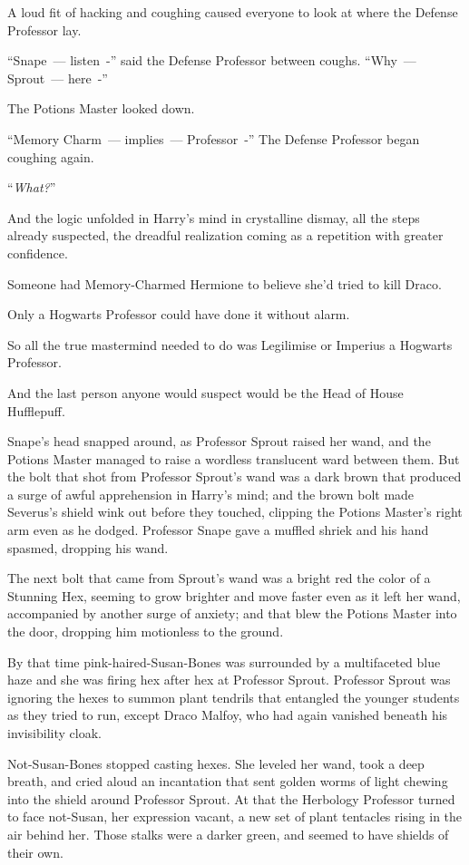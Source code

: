 A loud fit of hacking and coughing caused everyone to look at where the Defense Professor lay.

``Snape~--- listen~-'' said the Defense Professor between coughs. ``Why~--- Sprout~--- here~-''

The Potions Master looked down.

``Memory Charm~--- implies~--- Professor~-'' The Defense Professor began coughing again.

``\emph{What?}''

And the logic unfolded in Harry's mind in crystalline dismay, all the steps already suspected, the dreadful realization coming as a repetition with greater confidence.

Someone had Memory-Charmed Hermione to believe she'd tried to kill Draco.

Only a Hogwarts Professor could have done it without alarm.

So all the true mastermind needed to do was Legilimise or Imperius a Hogwarts Professor.

And the last person anyone would suspect would be the Head of House Hufflepuff.

Snape's head snapped around, as Professor Sprout raised her wand, and the Potions Master managed to raise a wordless translucent ward between them. But the bolt that shot from Professor Sprout's wand was a dark brown that produced a surge of awful apprehension in Harry's mind; and the brown bolt made Severus's shield wink out before they touched, clipping the Potions Master's right arm even as he dodged. Professor Snape gave a muffled shriek and his hand spasmed, dropping his wand.

The next bolt that came from Sprout's wand was a bright red the color of a Stunning Hex, seeming to grow brighter and move faster even as it left her wand, accompanied by another surge of anxiety; and that blew the Potions Master into the door, dropping him motionless to the ground.

By that time pink-haired-Susan-Bones was surrounded by a multifaceted blue haze and she was firing hex after hex at Professor Sprout. Professor Sprout was ignoring the hexes to summon plant tendrils that entangled the younger students as they tried to run, except Draco Malfoy, who had again vanished beneath his invisibility cloak.

Not-Susan-Bones stopped casting hexes. She leveled her wand, took a deep breath, and cried aloud an incantation that sent golden worms of light chewing into the shield around Professor Sprout. At that the Herbology Professor turned to face not-Susan, her expression vacant, a new set of plant tentacles rising in the air behind her. Those stalks were a darker green, and seemed to have shields of their own.

